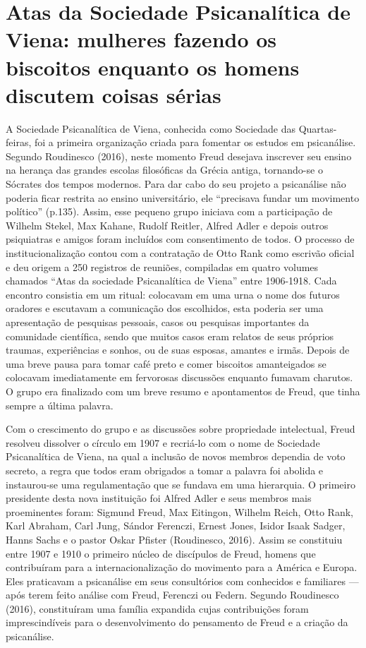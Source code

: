 \section{Atas da Sociedade Psicanalítica de Viena: mulheres fazendo os
biscoitos enquanto os homens discutem coisas sérias }

A Sociedade Psicanalítica de Viena, conhecida como Sociedade das
Quartas-feiras, foi a primeira organização criada para fomentar os
estudos em psicanálise. Segundo Roudinesco (2016), neste momento Freud
desejava inscrever seu ensino na herança das grandes escolas filosóficas
da Grécia antiga, tornando-se o Sócrates dos tempos modernos. Para dar
cabo do seu projeto a psicanálise não poderia ficar restrita ao ensino
universitário, ele ``precisava fundar um movimento político'' (p.135).
Assim, esse pequeno grupo iniciava com a participação de Wilhelm Stekel,
Max Kahane, Rudolf Reitler, Alfred Adler e depois outros psiquiatras e
amigos foram incluídos com consentimento de todos. O processo de
institucionalização contou com a contratação de Otto Rank como escrivão
oficial e deu origem a 250 registros de reuniões, compiladas em quatro
volumes chamados ``Atas da sociedade Psicanalítica de Viena'' entre
1906-1918. Cada encontro consistia em um ritual: colocavam em uma urna o
nome dos futuros oradores e escutavam a comunicação dos escolhidos, esta
poderia ser uma apresentação de pesquisas pessoais, casos ou pesquisas
importantes da comunidade científica, sendo que muitos casos eram
relatos de seus próprios traumas, experiências e sonhos, ou de suas
esposas, amantes e irmãs. Depois de uma breve pausa para tomar café
preto e comer biscoitos amanteigados se colocavam imediatamente em
fervorosas discussões enquanto fumavam charutos. O grupo era finalizado
com um breve resumo e apontamentos de Freud, que tinha sempre a última
palavra.

Com o crescimento do grupo e as discussões sobre propriedade
intelectual, Freud resolveu dissolver o círculo em 1907 e recriá-lo com
o nome de Sociedade Psicanalítica de Viena, na qual a inclusão de novos
membros dependia de voto secreto, a regra que todos eram obrigados a
tomar a palavra foi abolida e instaurou-se uma regulamentação que se
fundava em uma hierarquia. O primeiro presidente desta nova instituição
foi Alfred Adler e seus membros mais proeminentes foram: Sigmund Freud,
Max Eitingon, Wilhelm Reich, Otto Rank, Karl Abraham, Carl Jung, Sándor
Ferenczi, Ernest Jones, Isidor Isaak Sadger, Hanns Sachs e o pastor
Oskar Pfister (Roudinesco, 2016). Assim se constituiu entre 1907 e 1910
o primeiro núcleo de discípulos de Freud, homens que contribuíram para a
internacionalização do movimento para a América e Europa. Eles
praticavam a psicanálise em seus consultórios com conhecidos e
familiares --- após terem feito análise com Freud, Ferenczi ou Federn.
Segundo Roudinesco (2016), constituíram uma família expandida cujas
contribuições foram imprescindíveis para o desenvolvimento do pensamento
de Freud e a criação da psicanálise.

